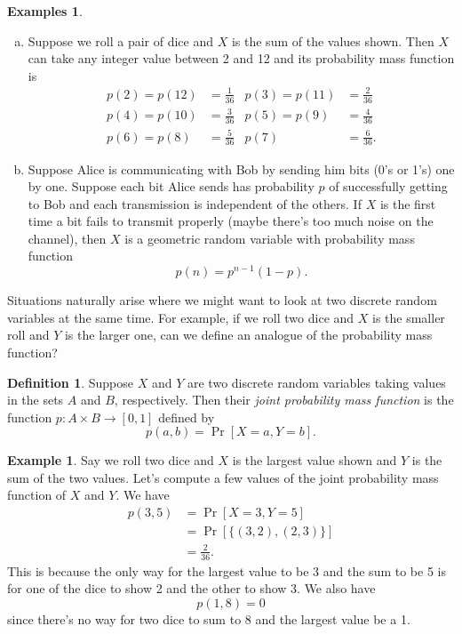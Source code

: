 \documentclass[12pt]{article}
\theoremstyle{plain}
\theoremstyle{definition}
\newtheorem{definition}[theorem]{Definition}
\newtheorem{example}[theorem]{Example}
\newtheorem{examples}[theorem]{Examples}
\theoremstyle{remark}
\begin{document}
\begin{examples}
\begin{enumerate}[(a)]
    \item Suppose we roll a pair of dice and $X$ is the sum of the values shown.
    Then $X$ can take any integer value between 2 and 12 and its probability mass function is
    \begin{align*}
        p(2) = p(12) &= \frac{1}{36} & p(3) = p(11)&= \frac{2}{36}\\
        p(4) = p(10) &= \frac{3}{36} & p(5) = p(9)&= \frac{4}{36}\\
        p(6) = p(8) &= \frac{5}{36} & p(7) &= \frac{6}{36}.
    \end{align*}

    \item Suppose Alice is communicating with Bob by sending him bits (0's or 1's) one by one.
    Suppose each bit Alice sends has probability $p$ of successfully getting to Bob and each transmission is independent of the others.
    If $X$ is the first time a bit fails to transmit properly (maybe there's too much noise on the channel), then $X$ is a geometric random variable with probability mass function
    \[
        p(n) = p^{n-1}(1-p).
    \]
\end{enumerate}
\end{examples}

Situations naturally arise where we might want to look at two discrete random variables at the same time.
For example, if we roll two dice and $X$ is the smaller roll and $Y$ is the larger one, can we define an analogue of the probability mass function?

\begin{definition}
    Suppose $X$ and $Y$ are two discrete random variables taking values in the sets $A$ and $B$, respectively.
    Then their \emph{joint probability mass function} is the function $p: A\times B\to [0,1]$ defined by
    \[
        p(a,b) = \Pr[X = a, Y = b].
    \]
\end{definition}

\begin{example}
    Say we roll two dice and $X$ is the largest value shown and $Y$ is the sum of the two values.
    Let's compute a few values of the joint probability mass function of $X$ and $Y$.
    We have
    \begin{align*}
        p(3, 5) &= \Pr[X = 3, Y = 5]\\
        &= \Pr[\{(3,2), (2,3)\}]\\
        &= \frac{2}{36}.
    \end{align*}
    This is because the only way for the largest value to be 3 and the sum to be 5 is for one of the dice to show 2 and the other to show 3.
    We also have
    \[
        p(1, 8) = 0
    \]
    since there's no way for two dice to sum to 8 and the largest value be a 1.
\end{example}
\end{document}
